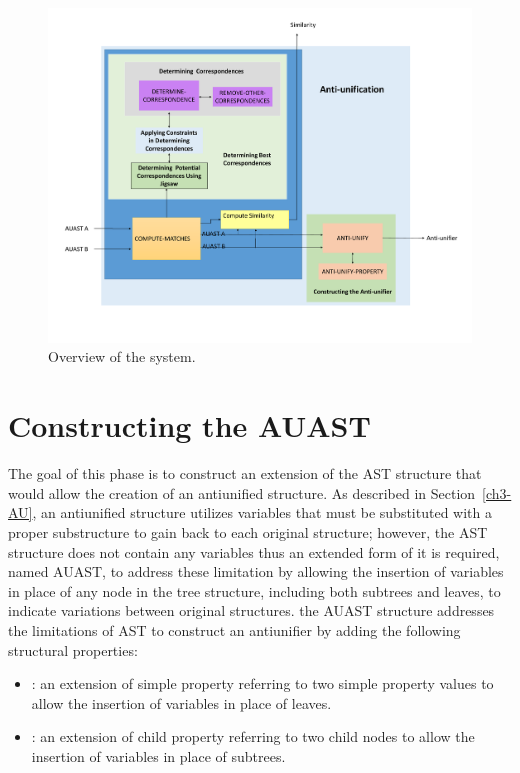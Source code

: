 \begin{figure} [H]
  \centering\includegraphics [width = \textwidth]{Drawing4/overview1.pdf}
  \caption{Overview of the system.}
  \label{fig:meth_overview}
\end{figure}


\section{Constructing the AUAST} \label{meth-constructAUAST}
The goal of this phase is to construct an extension of the AST structure that would allow the creation of an antiunified structure.
As described in Section~\ref{ch3-AU}, an antiunified structure utilizes variables that must be substituted with a proper substructure to gain back to each original structure; however, the AST structure does not contain any variables thus an extended form of it is required, named AUAST, to address these limitation by allowing the insertion of variables in place of any node in the tree structure, including both subtrees and leaves, to indicate variations between original structures. the AUAST structure addresses the limitations of AST to construct an antiunifier by adding the following structural properties:

\begin{itemize} [leftmargin=.4in]
\item {}: an extension of simple property referring to two simple property values to allow the insertion of variables in place of leaves.
\end{itemize}
\begin{itemize} [leftmargin=.4in]
\item {}: an extension of child property referring to two child nodes to allow the insertion of variables in place of subtrees.

\end{itemize}

